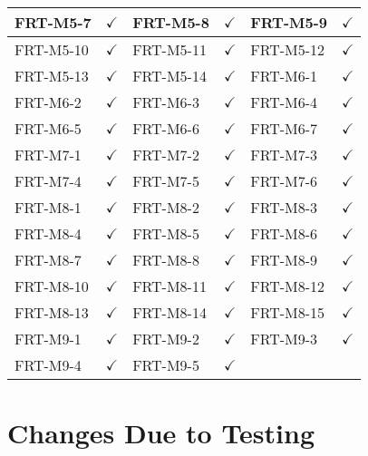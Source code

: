 \documentclass[12pt, titlepage]{article}
\begin{document}
\begin{longtable}{|l|c|l|c|l|c|}
	\midrule
	FRT-M5-7         & $\checkmark$    & FRT-M5-8         & $\checkmark$    & FRT-M5-9         & $\checkmark$    \\
	\midrule
	FRT-M5-10        & $\checkmark$    & FRT-M5-11        & $\checkmark$    & FRT-M5-12        & $\checkmark$    \\
	\midrule
	FRT-M5-13        & $\checkmark$    & FRT-M5-14        & $\checkmark$    & FRT-M6-1         & $\checkmark$    \\
	\midrule
	FRT-M6-2         & $\checkmark$    & FRT-M6-3         & $\checkmark$    & FRT-M6-4         & $\checkmark$    \\
	\midrule
	FRT-M6-5         & $\checkmark$    & FRT-M6-6         & $\checkmark$    & FRT-M6-7         & $\checkmark$    \\
	\midrule
	FRT-M7-1         & $\checkmark$    & FRT-M7-2         & $\checkmark$    & FRT-M7-3         & $\checkmark$    \\
	\midrule
	FRT-M7-4         & $\checkmark$    & FRT-M7-5         & $\checkmark$    & FRT-M7-6         & $\checkmark$    \\
	\midrule
	FRT-M8-1         & $\checkmark$    & FRT-M8-2         & $\checkmark$    & FRT-M8-3         & $\checkmark$    \\
	\midrule
	FRT-M8-4         & $\checkmark$    & FRT-M8-5         & $\checkmark$    & FRT-M8-6         & $\checkmark$    \\
	\midrule
	FRT-M8-7         & $\checkmark$    & FRT-M8-8         & $\checkmark$    & FRT-M8-9         & $\checkmark$    \\
	\midrule
	FRT-M8-10        & $\checkmark$    & FRT-M8-11        & $\checkmark$    & FRT-M8-12        & $\checkmark$    \\
	\midrule
	FRT-M8-13        & $\checkmark$    & FRT-M8-14        & $\checkmark$    & FRT-M8-15        & $\checkmark$    \\
	\midrule
	FRT-M9-1         & $\checkmark$    & FRT-M9-2         & $\checkmark$    & FRT-M9-3         & $\checkmark$    \\
	\midrule
	FRT-M9-4         & $\checkmark$    & FRT-M9-5         & $\checkmark$    & ~                & ~               \\
	\bottomrule
\end{longtable}

\newpage

\section{Changes Due to Testing}
\end{document}

